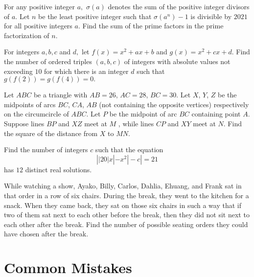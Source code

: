 \documentclass{article}
\begin{document}
\begin{prob}[AIME I 2021/14]{6}
For any positive integer $a,$ $\sigma(a)$ denotes the sum of the positive integer divisors of $a.$ Let $n$ be the least positive integer such that $\sigma(a^n)-1$ is divisible by $2021$ for all positive integers $a.$ Find the sum of the prime factors in the prime factorization of $n.$
\end{prob}

\begin{prob}[AIME I 2020/11]{9}
For integers $a,b,c$ and $d,$ let $f(x)=x^2+ax+b$ and $g(x)=x^2+cx+d.$ Find the number of ordered triples $(a,b,c)$ of integers with absolute values not exceeding $10$ for which there is an integer $d$ such that $g(f(2))=g(f(4))=0.$
\end{prob}

\begin{prob}{9}
Let $ABC$ be a triangle with $AB=26$, $AC=28$, $BC=30$. Let $X$, $Y$, $Z$ be the midpoints of arcs $BC$, $CA$, $AB$ (not containing the opposite vertices) respectively on the circumcircle of $ABC$. Let $P$ be the midpoint of arc $BC$ containing point $A$. Suppose lines $BP$ and $XZ$ meet at $M$ , while lines $CP$ and $XY$ meet at $N$. Find the square of the distance from $X$ to $MN$.
\end{prob}

\begin{prob}[AIME I 2021/8]{13}
Find the number of integers $c$ such that the equation $$\left||20|x|-x^2|-c\right|=21$$has $12$ distinct real solutions.
\end{prob}

\begin{prob}[AIME II 2020/9]{13}
While watching a show, Ayako, Billy, Carlos, Dahlia, Ehuang, and Frank sat in that order in a row of six chairs. During the break, they went to the kitchen for a snack. When they came back, they sat on those six chairs in such a way that if two of them sat next to each other before the break, then they did not sit next to each other after the break. Find the number of possible seating orders they could have chosen after the break.
\end{prob}


\pagebreak

\section{Common Mistakes}
\end{document}
